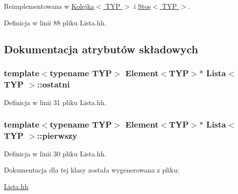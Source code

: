 Reimplementowana w \hyperlink{class_kolejka_a06a7fe157ff434771a700ffd084dc7a2}{Kolejka$<$ TYP $>$} i \hyperlink{class_stos_a6ff0d2aa5946c0dc413e3236ca99fd26}{Stos$<$ TYP $>$}.



Definicja w linii 88 pliku Lista.hh.



\subsection{Dokumentacja atrybutów składowych}
\hypertarget{class_lista_aefe3a0b196bd94713eebe3f9332011b1}{
\subsubsection[{ostatni}]{\setlength{\rightskip}{0pt plus 5cm}template$<$typename TYP$>$ {\bf Element}$<$TYP$>$$\ast$ {\bf Lista}$<$ TYP $>$::{\bf ostatni}}}
\label{class_lista_aefe3a0b196bd94713eebe3f9332011b1}


Definicja w linii 31 pliku Lista.hh.

\hypertarget{class_lista_a8557ec530a4dcf731449d708426fe5d5}{
\subsubsection[{pierwszy}]{\setlength{\rightskip}{0pt plus 5cm}template$<$typename TYP$>$ {\bf Element}$<$TYP$>$$\ast$ {\bf Lista}$<$ TYP $>$::{\bf pierwszy}}}
\label{class_lista_a8557ec530a4dcf731449d708426fe5d5}


Definicja w linii 30 pliku Lista.hh.



Dokumentacja dla tej klasy została wygenerowana z pliku:\begin{DoxyCompactItemize}
\item 
\hyperlink{_lista_8hh}{Lista.hh}\end{DoxyCompactItemize}
